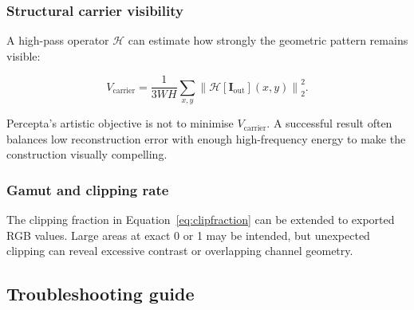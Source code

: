 \subsubsection{Structural carrier visibility}

A high-pass operator $\mathcal{H}$ can estimate how strongly the geometric pattern remains visible:

\begin{equation}
V_{\mathrm{carrier}}=
\frac{1}{3WH}
\sum_{x,y}
\left\|\mathcal{H}[\mathbf{I}_{\mathrm{out}}](x,y)\right\|_2^2.
\label{eq:carriervis}
\end{equation}

Percepta's artistic objective is not to minimise $V_{\mathrm{carrier}}$. A successful result often balances low reconstruction error with enough high-frequency energy to make the construction visually compelling.

\subsubsection{Gamut and clipping rate}

The clipping fraction in Equation~\eqref{eq:clipfraction} can be extended to exported RGB values. Large areas at exact 0 or 1 may be intended, but unexpected clipping can reveal excessive contrast or overlapping channel geometry.

\subsection{Troubleshooting guide}

